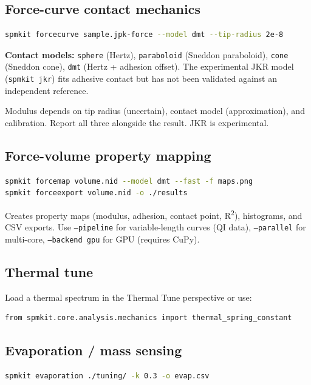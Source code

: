 \documentclass[a4paper,11pt]{article}
\begin{document}
\subsection{Force-curve contact mechanics}

\begin{lstlisting}[language=bash]
spmkit forcecurve sample.jpk-force --model dmt --tip-radius 2e-8
\end{lstlisting}

\textbf{Contact models:} \texttt{sphere} (Hertz), \texttt{paraboloid} (Sneddon paraboloid),
\texttt{cone} (Sneddon cone), \texttt{dmt} (Hertz + adhesion offset). The experimental JKR
model (\texttt{spmkit jkr}) fits adhesive contact but has not been validated against an
independent reference.

\begin{warnbox}[Caveats]
Modulus depends on tip radius (uncertain), contact model (approximation), and calibration.
Report all three alongside the result. JKR is experimental.
\end{warnbox}

\subsection{Force-volume property mapping}

\begin{lstlisting}[language=bash]
spmkit forcemap volume.nid --model dmt --fast -f maps.png
spmkit forceexport volume.nid -o ./results
\end{lstlisting}

Creates property maps (modulus, adhesion, contact point, R\textsuperscript{2}), histograms, and CSV exports.
Use \texttt{--pipeline} for variable-length curves (QI data),
\texttt{--parallel} for multi-core, \texttt{--backend gpu} for GPU (requires CuPy).

\subsection{Thermal tune}
Load a thermal spectrum in the Thermal Tune perspective or use:
\begin{lstlisting}[language=bash]
from spmkit.core.analysis.mechanics import thermal_spring_constant
\end{lstlisting}

\subsection{Evaporation / mass sensing}
\begin{lstlisting}[language=bash]
spmkit evaporation ./tuning/ -k 0.3 -o evap.csv
\end{lstlisting}
\end{document}
